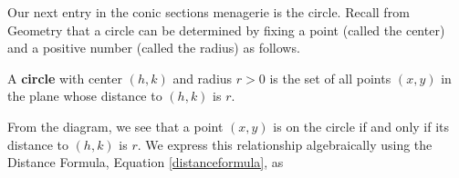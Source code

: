 \documentclass{ximera}
\begin{document}
	\author{Stitz-Zeager}




\setcounter{footnote}{0}

\setlength{\extrarowheight}{2pt}

\label{Circles}

Our next entry in the conic sections menagerie is the circle.  Recall from Geometry that a circle can be determined by fixing a point (called the center) and a positive number (called the radius) as follows.    

 


\begin{definition} \label{circledefn}  A \textbf{circle} with center $(h,k)$ and radius $r>0$ is the set of all points $(x, y)$ in the plane whose distance to $(h,k)$ is $r$.  

\end{definition} 

\begin{image}

\end{image}


From the diagram, we see that a point $(x,y)$ is on the circle if and only if its distance to $(h,k)$ is $r$.  We  express this relationship algebraically using the Distance Formula, Equation \ref{distanceformula}, as 
\end{document}
